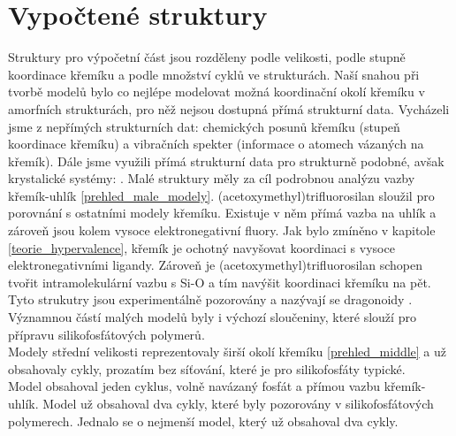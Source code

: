 \documentclass[
  digital, %
  table,   %
  lof,     %
  lot,     %
  oneside,
]{fithesis3}
\begin{document}
\section{Vypočtené struktury}
Struktury pro výpočetní část jsou rozděleny podle velikosti, podle stupně koordinace křemíku a podle množství cyklů ve strukturách. Naší snahou při tvorbě modelů bylo co nejlépe modelovat možná koordinační okolí křemíku v amorfních strukturách, pro něž nejsou dostupná přímá strukturní data. Vycházeli jsme z nepřímých strukturních dat: chemických posunů křemíku (stupeň koordinace křemíku) a vibračních spekter (informace o atomech vázaných na křemík). Dále jsme využili přímá strukturní data pro strukturně podobné, avšak krystalické systémy: \cite{C3NJ00721A} \cite{rtg_4_pinkas}. Malé struktury měly za cíl podrobnou analýzu vazby křemík-uhlík \ref{prehled_male_modely}. (acetoxymethyl)trifluorosilan sloužil pro porovnání s ostatními modely křemíku. Existuje v něm přímá vazba na uhlík a zároveň jsou kolem vysoce elektronegativní fluory. Jak bylo zmíněno v kapitole \ref{teorie_hypervalence}, křemík je ochotný navyšovat koordinaci s vysoce elektronegativními ligandy. Zároveň je (acetoxymethyl)trifluorosilan schopen tvořit intramolekulární vazbu s Si-O a tím navýšit koordinaci křemíku na pět. Tyto strukutry jsou experimentálně pozorovány a nazývají se dragonoidy \cite{Chipanina2011}. Významnou částí malých modelů byly i výchozí sloučeniny, které slouží pro přípravu silikofosfátových polymerů.\\
Modely střední velikosti reprezentovaly širší okolí křemíku \ref{prehled_middle} a už obsahovaly cykly, prozatím bez síťování, které je pro silikofosfáty typické. \\
Model  obsahoval jeden cyklus, volně navázaný fosfát a přímou vazbu křemík-uhlík. Model  už obsahoval dva cykly, které byly pozorovány v silikofosfátových polymerech. Jednalo se o nejmenší model, který už obsahoval dva cykly.\\
\end{document}
